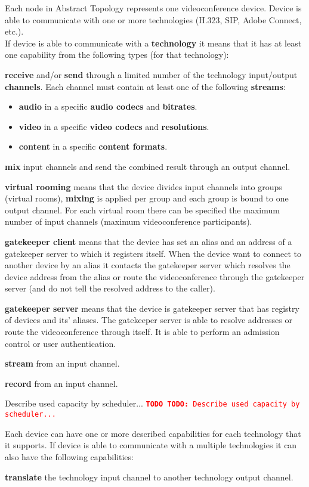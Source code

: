 \documentclass[a4paper]{report}
\newcommand{\TODO}[1]{%
\def\empty{}%
\def\prvniparametr{#1}%
\ifx\prvniparametr\empty%
\begingroup\tt\textcolor{red}{\noindent\textbf{TODO}}\endgroup
\else%
\begingroup\tt\textcolor{red}{\noindent\textbf{TODO:}\ #1}\endgroup
\fi%
}
\begin{document}
Each node in Abstract Topology represents one videoconference device. Device is able to communicate with one or more technologies (H.323, SIP, Adobe Connect, etc.).
\\
If device is able to communicate with a \textbf{technology} it means that it 
has at least one capability from the following types (for that technology):
\begin{compactitem}
\item \textbf{receive} and/or \textbf{send} through a limited number of 
  the technology input/output \textbf{channels}. Each channel must contain 
  at least one of the following \textbf{streams}:
  \begin{itemize}
    \item \textbf{audio} in a specific \textbf{audio codecs} and 
      \textbf{bitrates}.
    \item \textbf{video} in a specific \textbf{video codecs} and 
      \textbf{resolutions}.
    \item \textbf{content} in a specific \textbf{content formats}.
  \end{itemize} 
\item \textbf{mix} input channels and send the combined result through 
  an output channel.
\item \textbf{virtual rooming} means that the device divides input channels 
  into groups (virtual rooms), \textbf{mixing} is applied per group and
  each group is bound to one output channel. For each virtual room there can 
  be specified the maximum number of input channels (maximum videoconference 
  participants).
\item \textbf{gatekeeper client} means that the device has set an alias 
  and an address of a gatekeeper server to which it registers itself.
  When the device want to connect to another device by an alias it contacts 
  the gatekeeper server which resolves the device address from the alias 
  or route the videoconference through the gatekeeper server (and do not tell
  the resolved address to the caller).
\item \textbf{gatekeeper server} means that the device is gatekeeper server
  that has registry of devices and its' aliases. The gatekeeper server is
  able to resolve addresses or route the videoconference through itself. It is 
  able to perform an admission control or user authentication.
\item \textbf{stream} from an input channel.
\item \textbf{record} from an input channel.
\item \TODO{Describe used capacity by scheduler...}
\end{compactitem}
Each device can have one or more described capabilities for each technology
that it supports.
If device is able to communicate with a multiple technologies it can also have the following capabilities:
\begin{compactitem}
\item \textbf{translate} the technology input channel to another technology output 
  channel.
\end{compactitem}
\end{document}
